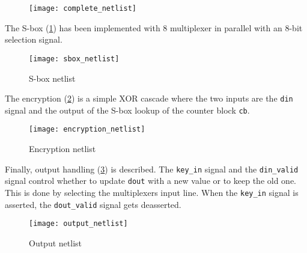 \clearpage
{}
\begin{figure}
    \thispagestyle{empty}
    \centering
    \hspace*{-9cm}
    \texttt{[image: complete\_netlist]}
\end{figure}
\restoregeometry
\clearpage

The S-box (\cref{fig:sbox_netlist}) has been implemented with 8 multiplexer in parallel with an 8-bit selection signal.
\begin{figure}[!ht]
    \centering
    \texttt{[image: sbox\_netlist]}
    \caption{S-box netlist}
    \label{fig:sbox_netlist}
\end{figure}

The encryption (\cref{fig:encryption_netlist}) is a simple XOR cascade where the two inputs are the \lstinline{din} signal and the output of the S-box lookup of the counter block \lstinline{cb}.
\begin{figure}
    \centering
    \texttt{[image: encryption\_netlist]}
    \caption{Encryption netlist}
    \label{fig:encryption_netlist}
\end{figure}

Finally, output handling (\cref{fig:output_netlist}) is described. The \lstinline{key_in} signal and the \lstinline{din_valid} signal control whether to update \lstinline{dout} with a new value or to keep the old one. This is done by selecting the multiplexers input line. When the \lstinline{key_in} signal is asserted, the \lstinline{dout_valid} signal gets deasserted.
\begin{figure}
    \centering
    \texttt{[image: output\_netlist]}
    \caption{Output netlist}
    \label{fig:output_netlist}
\end{figure}